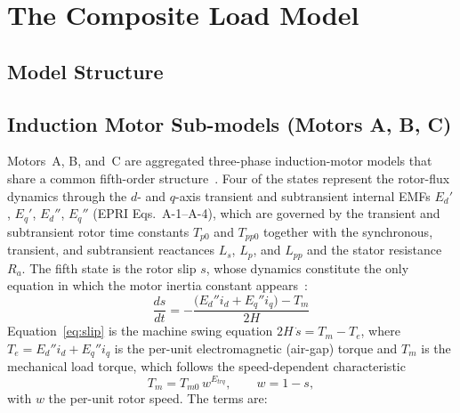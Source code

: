 \documentclass[journal]{IEEEtran}
\begin{document}
\section{The Composite Load Model}
\label{sec:background}

\subsection{Model Structure}

\subsection{Induction Motor Sub-models (Motors A, B, C)}
\label{sec:motorabc}
Motors~A, B, and~C are aggregated three-phase induction-motor models that
share a common fifth-order structure~\cite{EPRI3002019209}. Four of the states
represent the rotor-flux dynamics through the $d$- and $q$-axis transient and
subtransient internal EMFs $E_d'$, $E_q'$, $E_d''$, $E_q''$ (EPRI
Eqs.~A-1--A-4), which are governed by the transient and subtransient rotor
time constants $T_{p0}$ and $T_{pp0}$ together with the synchronous, transient,
and subtransient
reactances $L_s$, $L_p$, and $L_{pp}$ and the stator resistance $R_a$. The
fifth state is the rotor slip $s$, whose dynamics constitute the only equation
in which the motor inertia constant appears~\cite{EPRI3002019209,Zhao2019}:
%
\begin{equation}
    \frac{ds}{dt} = -\frac{\big(E_d'' i_d + E_q'' i_q\big) - T_m}{2H}
    \label{eq:slip}
\end{equation}
%
Equation~\eqref{eq:slip} is the machine swing equation $2H\,\dot{s} = T_m - T_e$,
where $T_e = E_d'' i_d + E_q'' i_q$ is the per-unit electromagnetic (air-gap)
torque and $T_m$ is the mechanical load torque, which follows the
speed-dependent characteristic~\cite{WECCspec2024}
\begin{equation}
    T_m = T_{m0}\,w^{E_{trq}}, \qquad w = 1 - s,
    \label{eq:loadtorque}
\end{equation}
with $w$ the per-unit rotor speed. The terms are:
\end{document}
